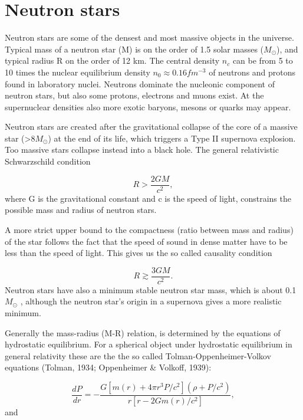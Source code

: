 \documentclass{wihuri}
\begin{document}
\section{Neutron stars}


Neutron stars are some of the densest and most massive objects in the
universe. Typical mass of a neutron star (M) is on the order of 1.5 solar masses ($M_{\odot}$), and typical radius R on the order of 12 km. The central density $n_{c}$ can be from 5 to 10 times the nuclear equilibrium density $n_{0} \approx 0.16 fm^{-3}$ of neutrons and protons found in laboratory nuclei. Neutrons dominate the nucleonic component of neutron stars, but also some protons, electrons and muons exist. At the supernuclear densities also more exotic baryons, mesons or quarks may appear.

 
Neutron stars are created after the gravitational collapse of the core of a
massive star (>8$M_{\odot}$) at the end of its life, which triggers a Type II supernova explosion. Too massive stars collapse instead into a black hole. The general relativistic Schwarzschild condition 

\begin{equation}
 R > \frac{2GM}{c^{2}},
 \end{equation} 
where G is the gravitational constant and c is the speed of light, constrains the possible mass and radius of neutron stars.

A more strict upper bound to the compactness (ratio between mass and radius) of the star follows
the fact %
that the speed of sound in dense matter have to be less than the speed of light. This gives us the so called causality condition

\begin{equation}
 R \gtrsim \frac{3GM}{c^{2}}.
 \end{equation} 
Neutron stars have also a minimum stable neutron star mass, which is about 0.1 $M_{\odot}$ , although the neutron star’s origin in a supernova gives a more realistic minimum.



Generally the mass-radius (M-R) relation, is determined by the equations of hydrostatic equilibrium. For a spherical object under hydrostatic equilibrium in general relativity these are the the so called Tolman-Oppenheimer-Volkov equations (Tolman,
1934; Oppenheimer \& Volkoff, 1939):


\begin{equation}
 \frac{dP}{dr} = -\frac{G[m(r)+4 \pi r^{3}P/c^{2}](\rho + P/c^{2})}{r[r-2Gm(r)/c^{2}]},
 \end{equation} 
and
\end{document}

